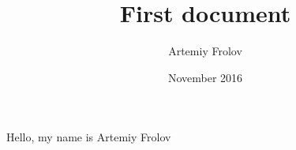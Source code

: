 \documentclass[12pt, a4papper]{article}
\title{First document}
\author{Artemiy Frolov}
\date{November 2016}
\begin{document}
\begin{titlepage}
\maketitle
\end{titlepage}

Hello, my name is Artemiy Frolov
\end{document}
